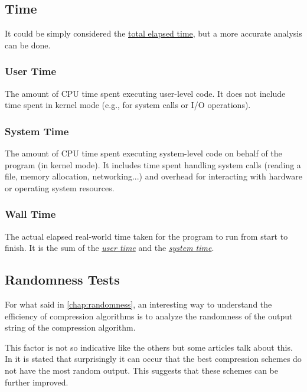 \documentclass[12pt, a4paper]{report}
\begin{document}
\subsection{Time}

It could be simply considered the \hyperref[subsubsec:wall_time]{total elapsed time}, but a more accurate analysis can be done.

\subsubsection{User Time}
\label{subsubsec:user_time}

The amount of CPU time spent executing user-level code.
It does not include time spent in kernel mode (e.g., for system calls or I/O operations).

\subsubsection{System Time}
\label{subsubsec:system_time}

The amount of CPU time spent executing system-level code on behalf of the program (in kernel mode).
It includes time spent handling system calls (reading a file, memory allocation, networking...) and overhead for interacting with
hardware or operating system resources.

\subsubsection{Wall Time}
\label{subsubsec:wall_time}

The actual elapsed real-world time taken for the program to run from start to finish.
It is the sum of the \hyperref[subsubsec:user_time]{\textit{user time}} and the
\hyperref[subsubsec:system_time]{\textit{system time}}.

\subsection{Randomness Tests}

For what said in \autoref{chap:randomness}, an interesting way to understand the efficiency of compression algorithms is to
analyze the randomness of the output string of the compression algorithm.

This factor is not so indicative like the others but some articles talk about this.
In \cite{OnTheRandomnessOfCompressedData} it is stated that surprisingly it can occur that the best compression schemes do not
have the most random output.
This suggests that these schemes can be further improved.
\end{document}
